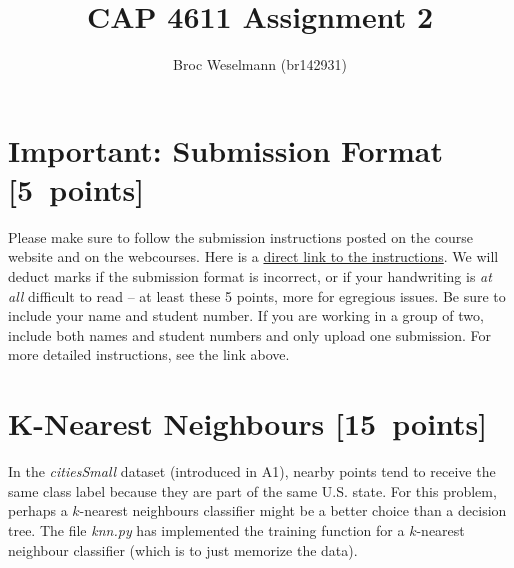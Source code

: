 \documentclass{article}
\newcommand{\blu}[1]{{\textcolor{blu}{#1}}}
\let\ask\blu
\newcommand\pts[1]{\textcolor{pointscolour}{[#1~points]}}
\begin{document}
    \title{CAP 4611 Assignment 2}
    \author{Broc Weselmann (br142931)}
    \date{}
    \maketitle
    \vspace{-4em}

    \section*{Important: Submission Format \pts{5}}

    Please make sure to follow the submission instructions posted on the
    course website and on the webcourses. Here is a \href{https://www.dropbox.com/scl/fi/s8u1c0b48pjbqpyl1ndno/submission_instructions.pdf?rlkey=skzx0ekx4i03nm9oh84h1tzis&st=fdo6jhf6&raw=1}{direct link to the instructions}.
    \ask{We will deduct marks if the submission format is incorrect, or
    if your handwriting is \emph{at all} difficult to read} -- at least
    these 5 points, more for egregious issues. Be sure to include your
    name and student number. If you are working in a group of two,
    include both names and student numbers and only upload one
    submission. For more detailed instructions, see the link above.

    \section{K-Nearest Neighbours \pts{15}}

    In the \emph{citiesSmall} dataset (introduced in A1), nearby points tend to receive the same class label because they are part of the same U.S. state. For this problem, perhaps a $k$-nearest neighbours classifier might be a better choice than a decision tree. The file \emph{knn.py} has implemented the training function for a $k$-nearest neighbour classifier (which is to just memorize the data).
\end{document}
